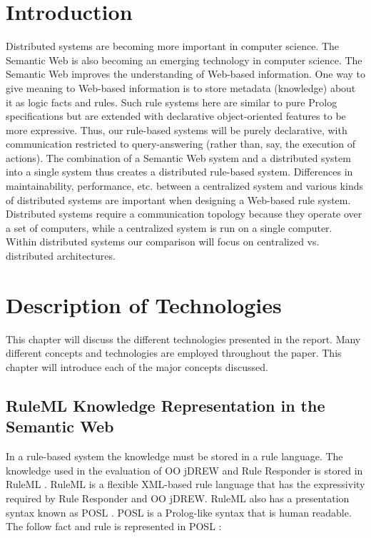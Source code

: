 \documentclass[12pt]{report}
\begin{document}
\tableofcontents
\newpage
\listoffigures
\newpage

\chapter{Introduction} 

Distributed systems are becoming more important in computer science.  The Semantic Web is also becoming an emerging technology in computer science.  The Semantic Web improves the understanding of Web-based information.  One way to give meaning to Web-based information is to store metadata (knowledge) about it as logic facts and rules.  Such rule systems here are similar to pure Prolog specifications but are extended with declarative object-oriented features to be more expressive. Thus, our rule-based systems will be purely declarative, with communication restricted to query-answering (rather than, say, the
execution of actions).  The combination of a Semantic Web system and a distributed system into a single system thus creates a distributed rule-based system.  Differences in maintainability, performance, etc. between a centralized system and various kinds of distributed systems are important when designing a Web-based rule system.  Distributed systems require a communication topology because they operate over a set of computers, while a centralized system is run on a single computer.  Within distributed systems our comparison will focus on centralized vs. distributed architectures.

\chapter{Description of Technologies}

This chapter will discuss the different technologies presented in the report.  Many different concepts and technologies are employed throughout the paper.  This chapter will introduce each of the major concepts discussed.

\section{RuleML Knowledge Representation in the Semantic Web}

In a rule-based system the knowledge must be stored in a rule language.  The knowledge used in the evaluation of OO jDREW and Rule Responder is stored in RuleML \cite{RuleML}.  RuleML is a flexible XML-based rule language that has the expressivity required by Rule Responder and OO jDREW.  RuleML also has a presentation syntax known as POSL \cite{POSL}. POSL is a Prolog-like syntax that is human readable.  The follow fact and rule is represented in POSL \cite{RuleMLTutorial}:
\end{document}
